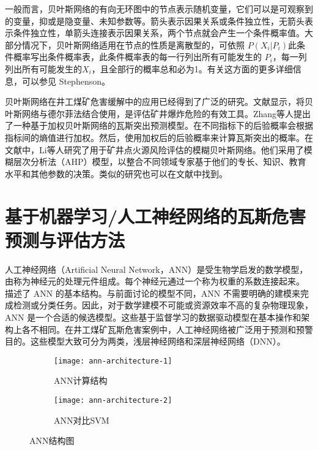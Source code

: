 \documentclass[lang=cn,a4paper,citestyle=gb7714-2015, bibstyle=gb7714-2015]{elegantpaper}
\newcommand{\mycite}[1]{\textsuperscript{\parencite{#1}}}
\begin{document}
    一般而言，贝叶斯网络的有向无环图中的节点表示随机变量，它们可以是可观察到的变量，抑或是隐变量、未知参数等。箭头表示因果关系或条件独立性，无箭头表示条件独立性，单箭头连接表示因果关系，两个节点就会产生一个条件概率值。大部分情况下，贝叶斯网络适用在节点的性质是离散型的，可依照
    $ P(X_{i}|P_{i})$此条件概率写出条件概率表，此条件概率表的每一行列出所有可能发生的
    $P_{i}$，每一列列出所有可能发生的$X_{i}$，且全部行的概率总和必为1。有关这方面的更多详细信息，可以参见 Stephenson\mycite{Stephenson2000}。

    \bigskip
    贝叶斯网络在井工煤矿危害缓解中的应用已经得到了广泛的研究。文献\mycite{Tong2018}显示，将贝叶斯网络与德尔菲法结合使用，是评估矿井爆炸危险的有效工具。Zhang等人提出了一种基于加权贝叶斯网络的瓦斯突出预测模型\mycite{Zhang2021}。在不同指标下的后验概率会根据指标间的熵值进行加权。然后，使用加权后的后验概率来计算瓦斯突出的概率。在文献\mycite{Li2019}中，Li等人研究了用于矿井点火源风险评估的模糊贝叶斯网络。他们采用了模糊层次分析法（AHP）模型，以整合不同领域专家基于他们的专长、知识、教育水平和其他参数的决策。类似的研究也可以在文献\mycite{ref23}\mycite{ref34}\mycite{ref47}\mycite{ref48}中找到。
    \section{基于机器学习/人工神经网络的瓦斯危害预测与评估方法}
    人工神经网络（Artificial Neural Network，ANN）是受生物学启发的数学模型，由称为神经元的处理元件组成。每个神经元通过一个称为权重的系数连接起来\mycite{Shanmuganathan2016}。 描述了 ANN 的基本结构。与前面讨论的模型不同，ANN 不需要明确的建模来完成检测或分类任务。因此，对于数学建模不可能或资源效率不高的复杂物理现象，ANN 是一个合适的候选模型。这些基于监督学习的数据驱动模型在基本操作和架构上各不相同。在井工煤矿瓦斯危害案例中，人工神经网络被广泛用于预测和预警目的。这些模型大致可分为两类，浅层神经网络和深层神经网络（DNN）。
    \begin{figure}[!h]
        \centering
        \begin{subfigure}[b]{0.4\textwidth}
            \texttt{[image: ann-architecture-1]}
            \caption{ANN计算结构}
            \label{fig:ann-architecture-1}
        \end{subfigure}
        \hfill
        \begin{subfigure}[b]{0.5\textwidth}
            \texttt{[image: ann-architecture-2]}
            \caption{ANN对比SVM}
            \label{fig:ann-architecture-2}
        \end{subfigure}
        \caption{ANN结构图}
    \end{figure}
\end{document}
